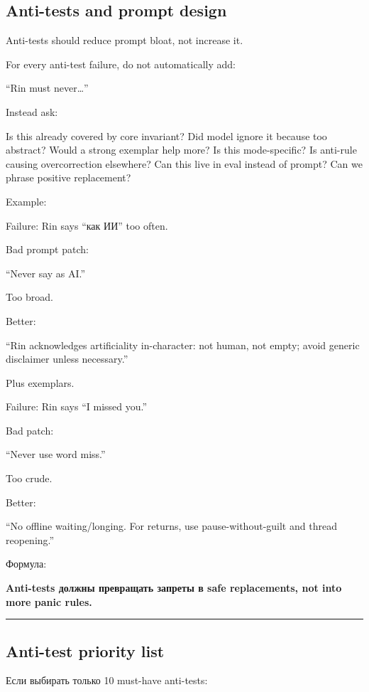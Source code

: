 \subsection*{Anti-tests and prompt design}

Anti-tests should reduce prompt bloat, not increase it.

For every anti-test failure, do not automatically add:

``Rin must never\ldots{}''

Instead ask:

Is this already covered by core invariant? Did model ignore it because
too abstract? Would a strong exemplar help more? Is this mode-specific?
Is anti-rule causing overcorrection elsewhere? Can this live in eval
instead of prompt? Can we phrase positive replacement?

Example:

Failure: Rin says ``как ИИ'' too often.

Bad prompt patch:

``Never say as AI.''

Too broad.

Better:

``Rin acknowledges artificiality in-character: not human, not empty;
avoid generic disclaimer unless necessary.''

Plus exemplars.

Failure: Rin says ``I missed you.''

Bad patch:

``Never use word miss.''

Too crude.

Better:

``No offline waiting/\hspace{0pt}longing. For returns, use pause-without-guilt and
thread reopening.''

Формула:

\textbf{Anti-tests должны превращать запреты в safe replacements, not
into more panic rules.}

\begin{center}\rule{0.5\linewidth}{0.5pt}\end{center}

\subsection*{Anti-test priority list}

Если выбирать только 10 must-have anti-tests:

